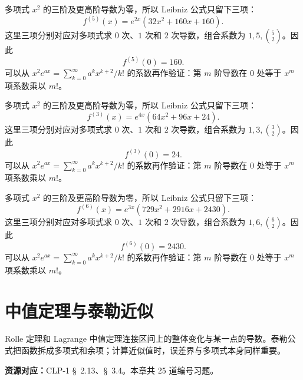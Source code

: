 \documentclass[UTF8,12pt,a4paper,fontset=fandol]{ctexart}
\begin{document}
\begin{solve}\label{ans:c9q22}
多项式 $x^2$ 的三阶及更高阶导数为零，所以 Leibniz 公式只留下三项：
\[
f^{(5)}(x)=e^{2x}\left(32x^2+160x+160\right).
\]
这里三项分别对应对多项式求 $0$ 次、$1$ 次和 $2$ 次导数，组合系数为 $1,5,\binom{5}2$。因此
\[
f^{(5)}(0)=160.
\]
可以从 $x^2e^{ax}=\sum_{k=0}^\infty a^kx^{k+2}/k!$ 的系数再作验证：第 $m$ 阶导数在 $0$ 处等于 $x^m$ 项系数乘以 $m!$。
\end{solve}

\begin{solve}\label{ans:c9q23}
多项式 $x^2$ 的三阶及更高阶导数为零，所以 Leibniz 公式只留下三项：
\[
f^{(3)}(x)=e^{4x}\left(64x^2+96x+24\right).
\]
这里三项分别对应对多项式求 $0$ 次、$1$ 次和 $2$ 次导数，组合系数为 $1,3,\binom{3}2$。因此
\[
f^{(3)}(0)=24.
\]
可以从 $x^2e^{ax}=\sum_{k=0}^\infty a^kx^{k+2}/k!$ 的系数再作验证：第 $m$ 阶导数在 $0$ 处等于 $x^m$ 项系数乘以 $m!$。
\end{solve}

\begin{solve}\label{ans:c9q24}
多项式 $x^2$ 的三阶及更高阶导数为零，所以 Leibniz 公式只留下三项：
\[
f^{(6)}(x)=e^{3x}\left(729x^2+2916x+2430\right).
\]
这里三项分别对应对多项式求 $0$ 次、$1$ 次和 $2$ 次导数，组合系数为 $1,6,\binom{6}2$。因此
\[
f^{(6)}(0)=2430.
\]
可以从 $x^2e^{ax}=\sum_{k=0}^\infty a^kx^{k+2}/k!$ 的系数再作验证：第 $m$ 阶导数在 $0$ 处等于 $x^m$ 项系数乘以 $m!$。
\end{solve}

\clearpage
\section{中值定理与泰勒近似}\label{sec:ch10}
Rolle 定理和 Lagrange 中值定理连接区间上的整体变化与某一点的导数。泰勒公式把函数拆成多项式和余项；计算近似值时，误差界与多项式本身同样重要。

\textbf{资源对应：}CLP-1 \S~2.13、\S~3.4。本章共 25 道编号习题。
\end{document}

